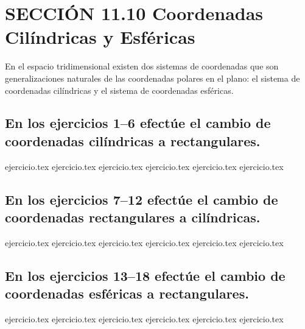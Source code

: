 
\section*{SECCIÓN 11.10 \quad Coordenadas Cilíndricas y Esféricas}

En el espacio tridimensional existen dos sistemas de coordenadas que son generalizaciones naturales de las coordenadas polares en el plano: el sistema de coordenadas cilíndricas y el sistema de coordenadas esféricas.

\vspace{0.5cm}
\subsection*{En los ejercicios 1--6 efectúe el cambio de coordenadas cilíndricas a rectangulares.}

\begin{enumerate}
    {ejercicio.tex}
{ejercicio.tex}
{ejercicio.tex}
{ejercicio.tex}
{ejercicio.tex}
{ejercicio.tex}
\end{enumerate}

\vspace{0.3cm}
\subsection*{En los ejercicios 7--12 efectúe el cambio de coordenadas rectangulares a cilíndricas.}

\begin{enumerate}
    \setcounter{enumi}{6}
    {ejercicio.tex}
{ejercicio.tex}
{ejercicio.tex}
{ejercicio.tex}
{ejercicio.tex}
{ejercicio.tex}
\end{enumerate}

\vspace{0.3cm}
\subsection*{En los ejercicios 13--18 efectúe el cambio de coordenadas esféricas a rectangulares.}

\begin{enumerate}
    \setcounter{enumi}{12}
    {ejercicio.tex}
{ejercicio.tex}
{ejercicio.tex}
{ejercicio.tex}
{ejercicio.tex}
{ejercicio.tex}
\end{enumerate}

